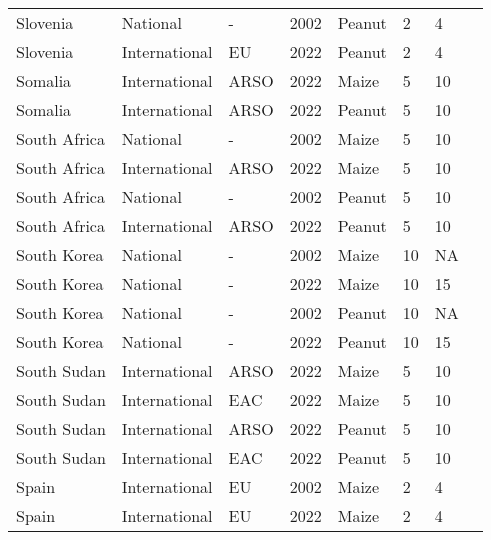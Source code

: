 \begin{landscape}
\begin{longtable}[c]{llllllll}
Slovenia          & National      & -        & 2002 & Peanut & 2  & 4  & \citet{van2004worldwide}     \\
Slovenia          & International & EU       & 2022 & Peanut & 2  & 4  & \citet{EC2010}               \\
Somalia           & International & ARSO     & 2022 & Maize  & 5  & 10 & \citet{ARSO2022}             \\
Somalia           & International & ARSO     & 2022 & Peanut & 5  & 10 & \citet{ARSO2022}             \\
South Africa      & National      & -        & 2002 & Maize  & 5  & 10 & \citet{van2004worldwide}     \\
South Africa      & International & ARSO     & 2022 & Maize  & 5  & 10 & \citet{ARSO2022}             \\
South Africa      & National      & -        & 2002 & Peanut & 5  & 10 & \citet{van2004worldwide}     \\
South Africa      & International & ARSO     & 2022 & Peanut & 5  & 10 & \citet{ARSO2022}             \\
South Korea       & National      & -        & 2002 & Maize  & 10 & NA & \citet{van2004worldwide}     \\
South Korea       & National      & -        & 2022 & Maize  & 10 & 15 & \citet{MFDS2019}             \\
South Korea       & National      & -        & 2002 & Peanut & 10 & NA & \citet{van2004worldwide}     \\
South Korea       & National      & -        & 2022 & Peanut & 10 & 15 & \citet{MFDS2019}             \\
South Sudan       & International & ARSO     & 2022 & Maize  & 5  & 10 & \citet{ARSO2022}             \\
South Sudan       & International & EAC      & 2022 & Maize  & 5  & 10 & \citet{EAC2018}              \\
South Sudan       & International & ARSO     & 2022 & Peanut & 5  & 10 & \citet{ARSO2022}             \\
South Sudan       & International & EAC      & 2022 & Peanut & 5  & 10 & \citet{EAC2018}              \\
Spain             & International & EU       & 2002 & Maize  & 2  & 4  & \citet{EC2010}               \\
Spain             & International & EU       & 2022 & Maize  & 2  & 4  & \citet{EC2010}               \\

\end{longtable}
\end{landscape}
